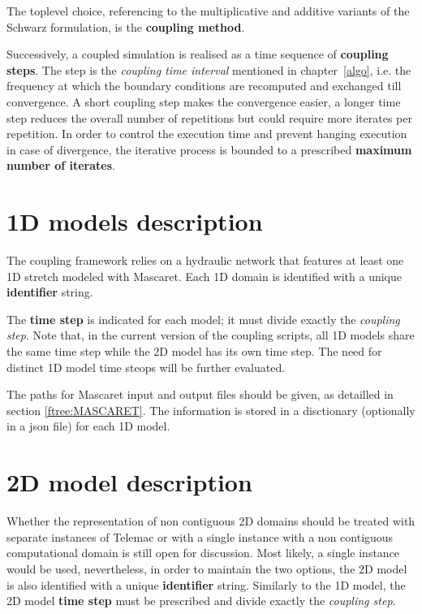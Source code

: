 \documentclass[Coupling]{../../data/TelemacDoc} %
\begin{document}
The toplevel choice, referencing to the multiplicative and
additive variants of the Schwarz formulation, is the {\bf coupling
  method}.
\newline

Successively, a coupled simulation is realised
as a time sequence of {\bf coupling steps}. The step is the {\em coupling time interval}
mentioned in chapter~\ref{algo}, i.e. the frequency at which the
boundary conditions are recomputed and exchanged till convergence. A
short coupling step makes the convergence easier, a longer time step
reduces the overall number of repetitions but could require more
iterates per repetition. In order to control the execution time and
prevent hanging execution in case of divergence, the
iterative process is bounded to a prescribed {\bf maximum number of iterates}.
\newline

\section{1D models description}\label{namcon:1DMOD}
The coupling framework relies on a hydraulic network that features at least one 1D stretch modeled with
Mascaret.  Each 1D domain is identified with a unique {\bf identifier} string.
\newline

The {\bf time step} is indicated for each model; it must
divide exactly the {\em coupling step}. Note that, in the
current version of the coupling scripts, all 1D models share the same time step while the 2D model has its own time step.
The need for distinct 1D model time steops will be further evaluated. 
\newline

The paths for Mascaret input and output files should be given,
as detailled in section \ref{ftree:MASCARET}. The information is stored 
in a disctionary (optionally in a json file) for each
1D model. 

\section{2D model description}\label{namcon:2DMOD}
Whether the representation of non contiguous 2D
domains should be treated with separate instances of Telemac
or with a single instance with a non contiguous computational
domain is still open for discussion. Most likely, a single instance would be used, nevertheless, in
order to maintain the two options, the 2D model
is also identified with a unique {\bf identifier} string.  
Similarly to the 1D model, the 2D model {\bf time
  step} must be prescribed and divide exactly the {\em coupling step}.
\end{document}
